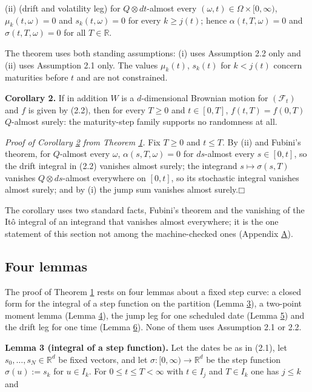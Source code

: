 \documentclass[11pt]{article}
\providecommand{\square}{\mdlgwhtsquare}
\begin{document}
(ii) (drift and volatility leg) for \(Q \otimes dt\)-almost every \((\omega, t) \in \Omega \times [0, \infty)\), \(\mu_k(t, \omega) = 0\) and \(s_k(t, \omega) = 0\) for every \(k \ge j(t)\); hence \(\alpha(t, T, \omega) = 0\) and \(\sigma(t, T, \omega) = 0\) for all \(T \in \mathbb R\).

The theorem uses both standing assumptions: (i) uses Assumption 2.2 only and (ii) uses Assumption 2.1 only. The values \(\mu_k(t)\), \(s_k(t)\) for \(k < j(t)\) concern maturities before \(t\) and are not constrained.

\label{res:Corollary-2}
\textbf{Corollary 2.} If in addition \(W\) is a \(d\)-dimensional Brownian motion for \((\mathcal F_t)\) and \(f\) is given by (2.2), then for every \(T \ge 0\) and \(t \in [0, T]\), \(f(t, T) = f(0, T)\) \(Q\)-almost surely: the maturity-step family supports no randomness at all.

\emph{Proof of Corollary \hyperref[res:Corollary-2]{2} from Theorem \hyperref[res:Theorem-1]{1}.} Fix \(T \ge 0\) and \(t \le T\). By (ii) and Fubini's theorem, for \(Q\)-almost every \(\omega\), \(\alpha(s, T, \omega) = 0\) for \(ds\)-almost every \(s \in [0, t]\), so the drift integral in (2.2) vanishes almost surely; the integrand \(s \mapsto \sigma(s, T)\) vanishes \(Q \otimes ds\)-almost everywhere on \([0, t]\), so its stochastic integral vanishes almost surely; and by (i) the jump sum vanishes almost surely.\hfill$\square$

The corollary uses two standard facts, Fubini's theorem and the vanishing of the Itô integral of an integrand that vanishes almost everywhere; it is the one statement of this section not among the machine-checked ones (Appendix \hyperref[sec:A]{A}).

\subsection{Four lemmas}\label{sec:3.2}

The proof of Theorem \hyperref[res:Theorem-1]{1} rests on four lemmas about a fixed step curve: a closed form for the integral of a step function on the partition (Lemma \hyperref[res:Lemma-3]{3}), a two-point moment lemma (Lemma \hyperref[res:Lemma-4]{4}), the jump leg for one scheduled date (Lemma \hyperref[res:Lemma-5]{5}) and the drift leg for one time (Lemma \hyperref[res:Lemma-6]{6}). None of them uses Assumption 2.1 or 2.2.

\label{res:Lemma-3}
\textbf{Lemma 3 (integral of a step function).} Let the dates be as in (2.1), let \(s_0, \dots, s_N \in \mathbb R^d\) be fixed vectors, and let \(\sigma : [0, \infty) \to \mathbb R^d\) be the step function \(\sigma(u) := s_k\) for \(u \in I_k\). For \(0 \le t \le T < \infty\) with \(t \in I_j\) and \(T \in I_k\) one has \(j \le k\) and
\end{document}
